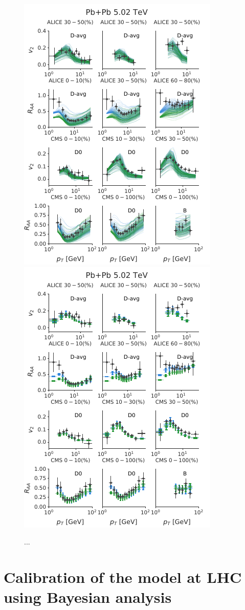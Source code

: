 \documentclass[aps, prc, reprint, amsmath, groupedaddress, nofootinbib]{revtex4-1}
\begin{document}
\begin{figure}
\includegraphics[width=.49\textwidth]{observables_design.pdf}
\includegraphics[width=.49\textwidth]{observables_posterior.pdf}
\caption{...}\label{plots:deisgn_posterior_obs}
\end{figure}


\section{Calibration of the model at LHC using Bayesian analysis}\label{section:prediction}
\end{document}
